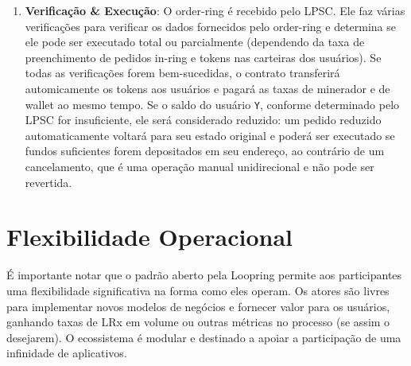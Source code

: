\documentclass[UTF8,nofonts]{article}
\makeatletter
\newenvironment{figurehere}
 {\def\@captype{figure}}
 {}
\makeatother
\begin{document}
\begin{multicols}{2}
\begin{enumerate}
\item \textbf{Verificação \& Execução}: O order-ring é recebido pelo LPSC. Ele faz várias verificações para verificar os dados fornecidos pelo order-ring e determina se ele pode ser executado total ou parcialmente (dependendo da taxa de preenchimento de pedidos in-ring e tokens nas carteiras dos usuários). Se todas as verificações forem bem-sucedidas, o contrato transferirá automicamente os tokens aos usuários e pagará as taxas de minerador e de wallet ao mesmo tempo. Se o saldo do usuário \verb|Y|, conforme determinado pelo LPSC for insuficiente, ele será considerado reduzido: um pedido reduzido automaticamente voltará para seu estado original e poderá ser executado se fundos suficientes forem depositados em seu endereço, ao contrário de um cancelamento, que é uma operação manual unidirecional e não pode ser revertida.


\end{enumerate}





%
%
%

\section{Flexibilidade Operacional\label{sec:business_model}}
É importante notar que o padrão aberto pela Loopring permite aos participantes uma flexibilidade significativa na forma como eles operam. Os atores são livres para implementar novos modelos de negócios e fornecer valor para os usuários, ganhando taxas de LRx em volume ou outras métricas no processo (se assim o desejarem). O ecossistema é modular e destinado a apoiar a participação de uma infinidade de aplicativos.



\end{multicols}
\end{document}
